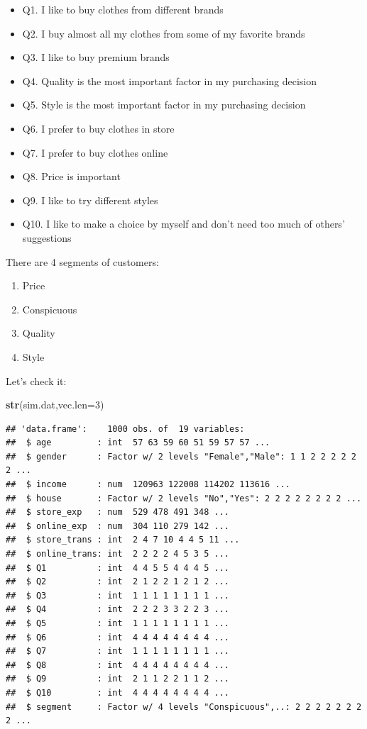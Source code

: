 \documentclass[12pt,]{krantz}
\newenvironment{Shaded}{\begin{snugshade}}{\end{snugshade}}
\newcommand{\KeywordTok}[1]{\textcolor[rgb]{0.13,0.29,0.53}{\textbf{{#1}}}}
\newcommand{\DataTypeTok}[1]{\textcolor[rgb]{0.13,0.29,0.53}{{#1}}}
\newcommand{\DecValTok}[1]{\textcolor[rgb]{0.00,0.00,0.81}{{#1}}}
\newcommand{\NormalTok}[1]{{#1}}
\providecommand{\tightlist}{%
  \setlength{\itemsep}{0pt}\setlength{\parskip}{0pt}}
\theoremstyle{definition}
\theoremstyle{definition}
\theoremstyle{remark}
\begin{document}
\begin{itemize}
\tightlist
\item
  Q1. I like to buy clothes from different brands
\item
  Q2. I buy almost all my clothes from some of my favorite brands
\item
  Q3. I like to buy premium brands
\item
  Q4. Quality is the most important factor in my purchasing decision
\item
  Q5. Style is the most important factor in my purchasing decision
\item
  Q6. I prefer to buy clothes in store
\item
  Q7. I prefer to buy clothes online
\item
  Q8. Price is important
\item
  Q9. I like to try different styles
\item
  Q10. I like to make a choice by myself and don't need too much of
  others' suggestions
\end{itemize}

There are 4 segments of customers:

\begin{enumerate}
\def\labelenumi{\arabic{enumi}.}
\tightlist
\item
  Price
\item
  Conspicuous
\item
  Quality
\item
  Style
\end{enumerate}

Let's check it:

\begin{Shaded}
\begin{Highlighting}[]
\KeywordTok{str}\NormalTok{(sim.dat,}\DataTypeTok{vec.len=}\DecValTok{3}\NormalTok{)}
\end{Highlighting}
\end{Shaded}

\begin{verbatim}
## 'data.frame':    1000 obs. of  19 variables:
##  $ age         : int  57 63 59 60 51 59 57 57 ...
##  $ gender      : Factor w/ 2 levels "Female","Male": 1 1 2 2 2 2 2 2 ...
##  $ income      : num  120963 122008 114202 113616 ...
##  $ house       : Factor w/ 2 levels "No","Yes": 2 2 2 2 2 2 2 2 ...
##  $ store_exp   : num  529 478 491 348 ...
##  $ online_exp  : num  304 110 279 142 ...
##  $ store_trans : int  2 4 7 10 4 4 5 11 ...
##  $ online_trans: int  2 2 2 2 4 5 3 5 ...
##  $ Q1          : int  4 4 5 5 4 4 4 5 ...
##  $ Q2          : int  2 1 2 2 1 2 1 2 ...
##  $ Q3          : int  1 1 1 1 1 1 1 1 ...
##  $ Q4          : int  2 2 2 3 3 2 2 3 ...
##  $ Q5          : int  1 1 1 1 1 1 1 1 ...
##  $ Q6          : int  4 4 4 4 4 4 4 4 ...
##  $ Q7          : int  1 1 1 1 1 1 1 1 ...
##  $ Q8          : int  4 4 4 4 4 4 4 4 ...
##  $ Q9          : int  2 1 1 2 2 1 1 2 ...
##  $ Q10         : int  4 4 4 4 4 4 4 4 ...
##  $ segment     : Factor w/ 4 levels "Conspicuous",..: 2 2 2 2 2 2 2 2 ...
\end{verbatim}
\end{document}
